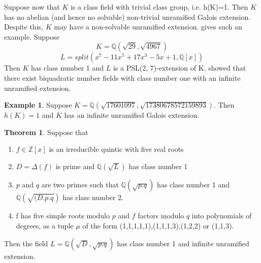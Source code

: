 \documentclass[12pt]{extarticle}
\newcommand{\Q}{\mathbb{Q}}
\newcommand{\<}{\langle}
\renewcommand{\>}{\rangle}
\theoremstyle{definition}
\newtheorem{theorem}{Theorem}
\newtheorem*{example}{Example}
\begin{document}
Suppose now that $K$ is a class field with trivial class group, i.e. h(K)=1. Then $K$ has no abelian (and hence no
solvable) non-trivial unramified Galois extension. Despite this, $K$ may have a non-solvable unramified extension. \cite{BRINK} gives such an example. Suppose
\begin{equation}
   K=\mathbb{Q}(\sqrt{29},\sqrt{4967}) 
\end{equation}
\begin{equation}
   L=split(x^7 - 11x^5 + 17x^3 - 5x + 1,\mathbb{Q}[x])
\end{equation}
Then $K$ has class number 1 and $L$ is a PSL(2, 7)-extension of K.
\cite{MAIR} showed that there exist biquadratic number fields with class number one with an infinite unramified extension. 
\begin{example}
Suppose $K= \Q( \sqrt{17601097}, \sqrt{17380678572159893})$. Then $h(K)=1$ and $K$ has an infinite unramified Galois extension. 
\end{example}
\begin{theorem}
\cite{BRINK} Suppose that \begin{enumerate}
    \item $f\in \mathbb{Z}[x]$ is an irreducible quintic with five real roots
    \item $D=\Delta(f)$ is prime and $\mathbb{Q}(\sqrt{L})$ has class number 1
    \item $p$ and $q$ are two primes such that $\mathbb{Q}(\sqrt{p.q})$ has class number 1 and $\mathbb{Q}(\sqrt{(D.p.q})$ has class number 2.
    \item f has five simple roots modulo $p$ and $f$ factors modulo $q$ into polynomials of degrees, as a tuple $\mu$ of the form (1,1,1,1,1),(1,1,1,3),(1,2,2) or (1,1,3).
\end{enumerate}
Then the field $L=\mathbb{Q}(\sqrt{D},\sqrt{p.q})$ has class number 1 and infinite unramified extension.
\end{theorem}
\end{document}
